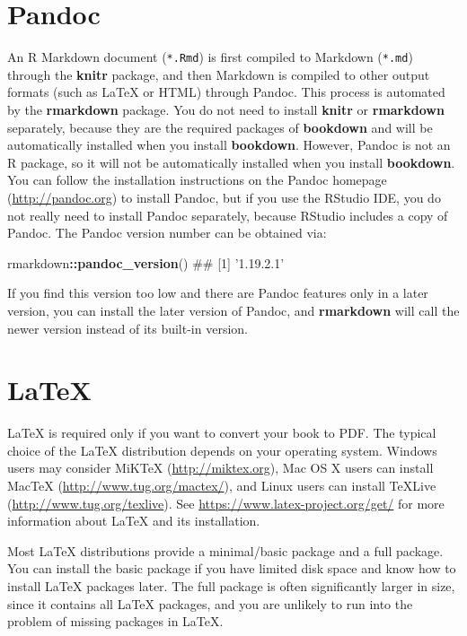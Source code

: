 \documentclass[12pt,]{krantz}
\makeatletter
\newenvironment{Shaded}{\begin{snugshade}}{\end{snugshade}}
\newcommand{\KeywordTok}[1]{\textcolor[rgb]{0.13,0.29,0.53}{\textbf{#1}}}
\newcommand{\OperatorTok}[1]{\textcolor[rgb]{0.81,0.36,0.00}{\textbf{#1}}}
\newcommand{\NormalTok}[1]{#1}
\newenvironment{kframe}{%
\medskip{}
\setlength{\fboxsep}{.8em}
 \def\at@end@of@kframe{}%
 \ifinner\ifhmode%
  \def\at@end@of@kframe{\end{minipage}}%
  \begin{minipage}{\columnwidth}%
 \fi\fi%
 \def\FrameCommand##1{\hskip\@totalleftmargin \hskip-\fboxsep
 \colorbox{shadecolor}{##1}\hskip-\fboxsep
     \hskip-\linewidth \hskip-\@totalleftmargin \hskip\columnwidth}%
 \MakeFramed {\advance\hsize-\width
   \@totalleftmargin\z@ \linewidth\hsize
   \@setminipage}}%
 {\par\unskip\endMakeFramed%
 \at@end@of@kframe}
\renewenvironment{Shaded}{\begin{kframe}}{\end{kframe}}
\theoremstyle{definition}
\theoremstyle{definition}
\theoremstyle{definition}
\theoremstyle{remark}
\makeatother
\begin{document}
\section{Pandoc}\label{pandoc}

An R Markdown document (\texttt{*.Rmd}) is first compiled to Markdown
(\texttt{*.md}) through the \textbf{knitr} package, and then Markdown is
compiled to other output formats (such as LaTeX or HTML) through
Pandoc. This process is automated by the
\textbf{rmarkdown} package. You do not need to install \textbf{knitr} or
\textbf{rmarkdown} separately, because they are the required packages of
\textbf{bookdown} and will be automatically installed when you install
\textbf{bookdown}. However, Pandoc is not an R package, so it will not
be automatically installed when you install \textbf{bookdown}. You can
follow the installation instructions on the Pandoc homepage
(\url{http://pandoc.org}) to install Pandoc, but if you use the RStudio
IDE, you do not really need to install Pandoc separately, because
RStudio includes a copy of Pandoc. The Pandoc version number can be
obtained via:

\begin{Shaded}
\begin{Highlighting}[]
\NormalTok{rmarkdown}\OperatorTok{::}\KeywordTok{pandoc_version}\NormalTok{()}
\NormalTok{## [1] '1.19.2.1'}
\end{Highlighting}
\end{Shaded}

If you find this version too low and there are Pandoc features only in a
later version, you can install the later version of Pandoc, and
\textbf{rmarkdown} will call the newer version instead of its built-in
version.

\section{LaTeX}\label{latex}

LaTeX is required only if you want to convert your book to
PDF. The typical choice of the LaTeX distribution depends on your
operating system. Windows users may consider MiKTeX
(\url{http://miktex.org}), Mac OS X users can install MacTeX
(\url{http://www.tug.org/mactex/}), and Linux users can install TeXLive
(\url{http://www.tug.org/texlive}). See
\url{https://www.latex-project.org/get/} for more information about
LaTeX and its installation.

Most LaTeX distributions provide a minimal/basic package and a full
package. You can install the basic package if you have limited disk
space and know how to install LaTeX packages later. The full package is
often significantly larger in size, since it contains all LaTeX
packages, and you are unlikely to run into the problem of missing
packages in LaTeX.
\end{document}
